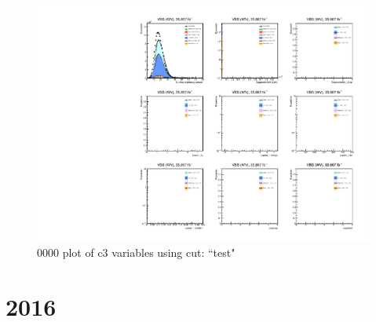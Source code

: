 \documentclass{article}
\begin{document}
                        \begin{figure}[H]
                            \centering
                            \caption{0000 plot of c3 variables using cut: ``test"}
                            \includegraphics[width=\textwidth]{0000/c3_0000_test.pdf}
                        \end{figure}    
    \section*{2016}
\end{document}
